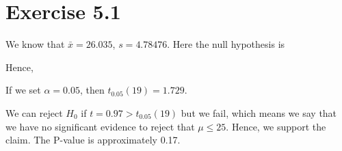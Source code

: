 \section*{Exercise 5.1}
We know that $\bar{x}=26.035$, $s=4.78476$. Here the null hypothesis is

Hence,

If we set $\alpha=0.05$, then $t_{0.05}(19)=1.729$.

We can reject $H_0$ if $t=0.97>t_{0.05}(19)$ but we fail, which means we say that we have no significant evidence to reject that $\mu\leq25$. Hence, we support the claim. The P-value is approximately 0.17.

